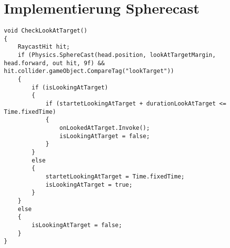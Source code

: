 \newpage
\section{Implementierung Spherecast}
\label{code:spherecast}
\begin{lstlisting}[caption={Implementierung von Spherecast um Blickkontakt überprüfen zu können},captionpos=b,label={lst:skript_spherecast}]
void CheckLookAtTarget()
{
    RaycastHit hit;
    if (Physics.SphereCast(head.position, lookAtTargetMargin, head.forward, out hit, 9f) && hit.collider.gameObject.CompareTag("lookTarget"))
    {
        if (isLookingAtTarget)
        {
            if (startetLookingAtTarget + durationLookAtTarget <= Time.fixedTime)
            {
                onLookedAtTarget.Invoke();
                isLookingAtTarget = false;
            }
        }
        else
        {
            startetLookingAtTarget = Time.fixedTime;
            isLookingAtTarget = true;
        }
    }
    else
    {
        isLookingAtTarget = false;
    }
}
\end{lstlisting}

\newpage
